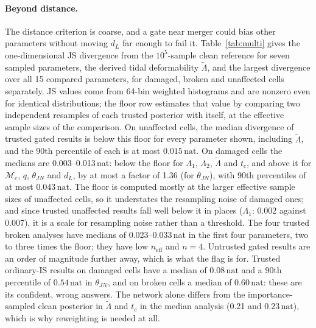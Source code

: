 \documentclass{openjournal}
\newcommand{\dL}{d_L}
\newcommand{\neff}{n_{\mathrm{eff}}}
\begin{document}
\paragraph{Beyond distance.}
The distance criterion is coarse, and a gate near merger could bias other parameters without moving $\dL$ far enough to fail it.
Table~\ref{tab:multi} gives the one-dimensional JS divergence from the $10^{5}$-sample clean reference for seven sampled parameters, the derived tidal deformability $\tilde\Lambda$, and the largest divergence over all 15 compared parameters, for damaged, broken and unaffected cells separately.
JS values come from 64-bin weighted histograms and are nonzero even for identical distributions; the floor row estimates that value by comparing two independent resamples of each trusted posterior with itself, at the effective sample sizes of the comparison.
On unaffected cells, the median divergence of trusted gated results is below this floor for every parameter shown, including $\tilde\Lambda$, and the 90th percentile of each is at most $0.015\,\mathrm{nat}$. On damaged cells the medians are 0.003--0.013\,nat: below the floor for $\Lambda_1$, $\Lambda_2$, $\tilde\Lambda$ and $t_c$, and above it for $\mathcal{M}_c$, $q$, $\theta_{JN}$ and $\dL$, by at most a factor of 1.36 (for $\theta_{JN}$), with 90th percentiles of at most $0.043\,\mathrm{nat}$. The floor is computed mostly at the larger effective sample sizes of unaffected cells, so it understates the resampling noise of damaged ones; and since trusted unaffected results fall well below it in places ($\Lambda_1$: 0.002 against 0.007), it is a scale for resampling noise rather than a threshold. The four trusted broken analyses have medians of 0.023--0.033\,nat in the first four parameters, two to three times the floor; they have low $\neff$ and $n=4$.
Untrusted gated results are an order of magnitude further away, which is what the flag is for.
Trusted ordinary-IS results on damaged cells have a median of $0.08\,\mathrm{nat}$ and a 90th percentile of $0.54\,\mathrm{nat}$ in $\theta_{JN}$, and on broken cells a median of $0.60\,\mathrm{nat}$: these are its confident, wrong answers.
The network alone differs from the importance-sampled clean posterior in $\tilde\Lambda$ and $t_c$ in the median analysis (0.21 and $0.23\,\mathrm{nat}$), which is why reweighting is needed at all.
\end{document}
